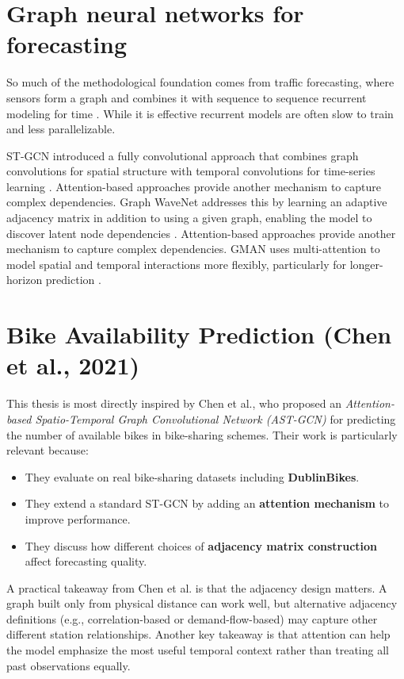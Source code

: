 \documentclass[11pt]{report}
\begin{document}
\section{Graph neural networks for forecasting}
So much of the methodological foundation comes from traffic forecasting, where sensors form a graph and combines it with sequence to sequence recurrent modeling for time \cite{li2018dcrnn}. While it is effective recurrent models are often slow to train and less parallelizable.

ST-GCN introduced a fully convolutional approach that combines graph convolutions for spatial structure with temporal convolutions for time-series learning \cite{yu2018stgcn}.  Attention-based approaches provide another mechanism to capture complex dependencies. Graph WaveNet addresses this by learning an adaptive adjacency matrix in addition to using a given graph, enabling the model to discover latent node dependencies \cite{wu2019graphwavenet}. Attention-based approaches provide another mechanism to capture complex dependencies. GMAN uses multi-attention to model spatial and temporal interactions more flexibly, particularly for longer-horizon prediction \cite{zheng2020gman}.


\section{Bike Availability Prediction (Chen et al., 2021)}
This thesis is most directly inspired by Chen et al., who proposed an \textit{Attention-based Spatio-Temporal Graph Convolutional Network (AST-GCN)} for predicting the number of available bikes in bike-sharing schemes. Their work is particularly relevant because:
\begin{itemize}
    \item They evaluate on real bike-sharing datasets including \textbf{DublinBikes}.
    \item They extend a standard ST-GCN by adding an \textbf{attention mechanism} to improve performance.
    \item They discuss how different choices of \textbf{adjacency matrix construction} affect forecasting quality.
\end{itemize}

A practical takeaway from Chen et al. is that the adjacency design matters. A graph built only from physical distance can work well, but alternative adjacency definitions (e.g., correlation-based or demand-flow-based) may capture other different station relationships. Another key takeaway is that attention can help the model emphasize the most useful temporal context rather than treating all past observations equally.
\end{document}
